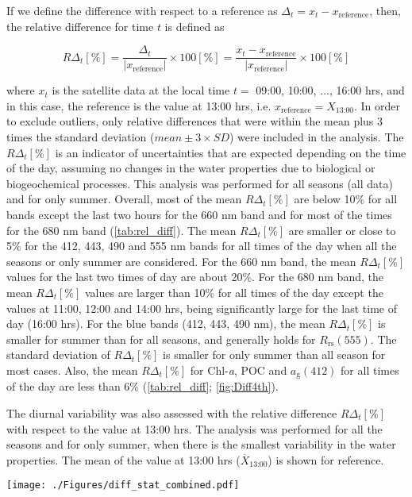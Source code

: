 \documentclass[remotesensing,article,submit,moreauthors,pdftex,10pt,a4paper]{Definitions/mdpi}
\begin{document}
If we define the difference with respect to a reference as $\Delta_t=x_t-x_\text{reference}$, then, the relative difference for time $t$ is defined as
\begin{linenomath*}
\begin{equation}
	R\Delta_t[\%] = \frac{\Delta_t}{|x_\text{reference}|} \times 100[\%] = \frac{x_t-x_\text{reference}}{|x_\text{reference}|}
	\times 100[\%]
\end{equation}
\end{linenomath*}
where $x_t$ is the satellite data at the local time $t =$ 09:00, 10:00, $\dots$, 16:00 hrs, and in this case, the reference is the value at 13:00 hrs, i.e. $x_\text{reference} = X_\text{13:00}$. In order to exclude outliers, only relative differences that were within the mean plus 3 times the standard deviation ($mean\pm3\times SD$) were included in the analysis. The $R\Delta_t[\%]$ is an indicator of uncertainties that are expected depending on the time of the day, assuming no changes in the water properties due to biological or biogeochemical processes. This analysis was performed for all seasons (all data) and for only summer. Overall, most of the mean $R\Delta_t[\%]$ are below 10\% for all bands except the last two hours for the 660 nm band and for most of the times for the 680 nm band (\autoref{tab:rel_diff}). The mean $R\Delta_t[\%]$ are smaller or close to 5\% for the 412, 443, 490 and 555 nm bands for all times of the day when all the seasons or only summer are considered. For the 660 nm band, the mean $R\Delta_t[\%]$ values for the last two times of day are about 20\%. For the 680 nm band, the mean $R\Delta_t[\%]$ values are larger than 10\% for all times of the day except the values at 11:00, 12:00 and 14:00 hrs, being significantly large for the last time of day (16:00 hrs). For the blue bands (412, 443, 490 nm), the mean $R\Delta_t[\%]$ is smaller for summer than for all seasons, and generally holds for $R_\text{rs}(555)$. The standard deviation of $R\Delta_t[\%]$ is smaller for only summer than all season for most cases. Also, the mean $R\Delta_t[\%]$ for Chl-{\it a}, POC and $a_\text{g}(412)$ for all times of the day are less than 6\%  (\autoref{tab:rel_diff}; \autoref{fig:Diff4th}). 



  \begin{table}[htbp!]
  \caption{The diurnal variability was also assessed with the relative difference $R\Delta_t[\%]$ with respect to the value at 13:00 hrs. The analysis was performed for all the seasons and for only summer, when there is the smallest variability in the water properties. The mean of the value at 13:00 hrs ($\overline{X}_\text{13:00}$) is shown for reference. \label{tab:rel_diff} } 
  \centering
  \texttt{[image: ./Figures/diff\_stat\_combined.pdf]}
  \end{table}
\end{document}
